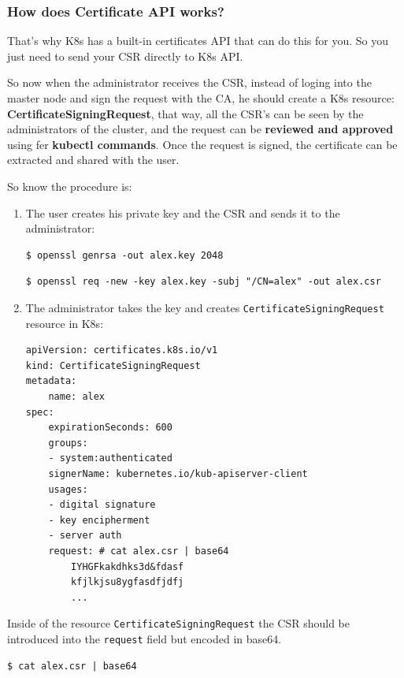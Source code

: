 \documentclass{article}
\newenvironment{blocktemplateIII}[1]{%
    \tcolorbox[beamer,%
    noparskip,breakable,
    ,colframe=Red,%
    colbacklower=LimeGreen!75!LightGreen,%
    title=#1]}%
    {\endtcolorbox}
\newenvironment{codetemplate}[1][]{%
  \mybasecolorbox[#1]
  \itshape
}{%
  \endmybasecolorbox
}
\begin{document}
\subsubsection{How does Certificate API works?}

That's why K8s has a built-in certificates API that can do this for you. So you just need to send your CSR directly to K8s API.

So now when the administrator receives the CSR, instead of loging into the master node and sign the request with the CA, he should create a K8s resource: \textbf{CertificateSigningRequest},
that way, all the CSR's can be seen by the administrators of the cluster, and the request can be \textbf{reviewed and approved} using fer \textbf{kubectl commands}. Once the request is signed, the certificate can be extracted and shared with the user.

So know the procedure is:
\begin{enumerate}
    \item The user creates his private key and the CSR and sends it to the administrator:
\begin{codetemplate}{}
\begin{verbatim}
$ openssl genrsa -out alex.key 2048
\end{verbatim}
\end{codetemplate}
\begin{codetemplate}{}
\begin{verbatim}
$ openssl req -new -key alex.key -subj "/CN=alex" -out alex.csr
\end{verbatim}
\end{codetemplate}

    \item The administrator takes the key and creates \verb|CertificateSigningRequest| resource in K8s:
\begin{codetemplate}{}
\begin{verbatim}
apiVersion: certificates.k8s.io/v1
kind: CertificateSigningRequest
metadata:
    name: alex
spec:
    expirationSeconds: 600
    groups:
    - system:authenticated
    signerName: kubernetes.io/kub-apiserver-client
    usages:
    - digital signature
    - key encipherment
    - server auth
    request: # cat alex.csr | base64
        IYHGFkakdhks3d&fdasf
        kfjlkjsu8ygfasdfjdfj
        ...
\end{verbatim}
\end{codetemplate}
\end{enumerate}

\begin{blocktemplateIII}{WARNING}
Inside of the resource \verb|CertificateSigningRequest| the CSR should be introduced into the \verb|request| field
but encoded in base64.
\begin{codetemplate}{}
\begin{verbatim}
$ cat alex.csr | base64
\end{verbatim}
\end{codetemplate}
\end{blocktemplateIII}
\end{document}

